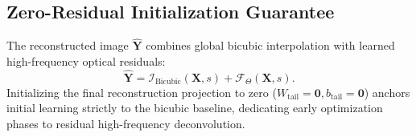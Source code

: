 \documentclass[letterpaper,journal,twoside]{IEEEtran}
\begin{document}
\subsection{Zero-Residual Initialization Guarantee}
The reconstructed image $\hat{\mathbf{Y}}$ combines global bicubic interpolation with learned high-frequency optical residuals:
\begin{equation}
\hat{\mathbf{Y}} = \mathcal{I}_{\text{Bicubic}}(\mathbf{X}, s) + \mathcal{F}_\Theta(\mathbf{X}, s).
\label{eq:zero_residual}
\end{equation}
Initializing the final reconstruction projection to zero ($W_{\text{tail}} = \mathbf{0}, b_{\text{tail}} = \mathbf{0}$) anchors initial learning strictly to the bicubic baseline, dedicating early optimization phases to residual high-frequency deconvolution.
\end{document}

